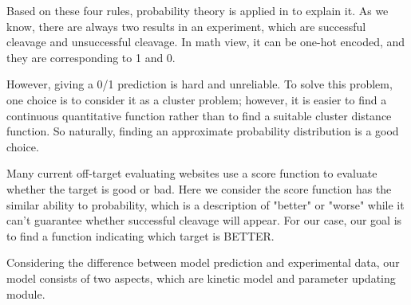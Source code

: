 Based on these four rules, probability theory is applied in to explain it. As we know, there are always two results in an experiment, which are successful cleavage and unsuccessful cleavage. In math view, it can be one-hot encoded, and they are corresponding to 1 and 0. 

However, giving a 0/1 prediction is hard and unreliable. To solve this problem, one choice is to consider it as a cluster problem; however, it is easier to find a continuous quantitative function rather than to find a suitable cluster distance function. So naturally, finding an approximate probability distribution is a good choice. 
	
Many current off-target evaluating websites use a score function to evaluate whether the target is good or bad. Here we consider the score function has the similar ability to probability, which is a description of "better" or "worse" while it can’t guarantee whether successful cleavage will appear. For our case, our goal is to find a function indicating which target is BETTER.
	
Considering the difference between model prediction and experimental data, our model consists of two aspects, which are kinetic model and  parameter updating module.